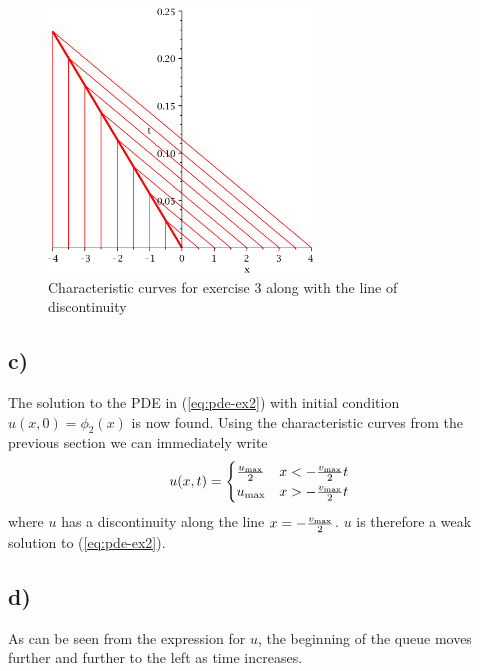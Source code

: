     \begin{figure}[ht]
        \centering
        \includegraphics[width=70mm]{media/characteristics-ex3-with-shock.pdf}
        \caption{Characteristic curves for exercise 3 along with the line of discontinuity}
        \label{fig:characteristics-with-shock}
    \end{figure}

    \subsection*{c)}
    The solution to the PDE in (\ref{eq:pde-ex2}) with initial condition $u(x,0)=\phi_2(x)$ is now found. Using the characteristic curves from the previous section we can immediately write
    \begin{equation*}
        u(x,t) = \begin{cases}
            \frac{u_{\text{max}}}{2} & x < -\frac{v_{\text{max}}}{2}t \\
            u_{\text{max}} & x > -\frac{v_{\text{max}}}{2}t
        \end{cases}
    \end{equation*}
    where $u$ has a discontinuity along the line $x=-\frac{v_{\text{max}}}{2}$. $u$ is therefore a weak solution to (\ref{eq:pde-ex2}).

    \subsection*{d)}
    As can be seen from the expression for $u$, the beginning of the queue moves further and further to the left as time increases.



